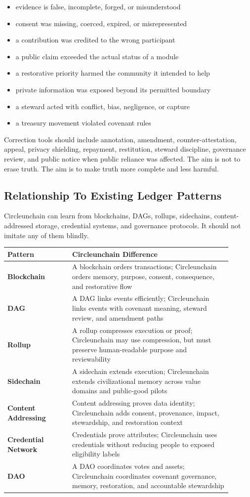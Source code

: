 \documentclass[12pt]{article}
\begin{document}
\begin{itemize}
  \item evidence is false, incomplete, forged, or misunderstood
  \item consent was missing, coerced, expired, or misrepresented
  \item a contribution was credited to the wrong participant
  \item a public claim exceeded the actual status of a module
  \item a restorative priority harmed the community it intended to help
  \item private information was exposed beyond its permitted boundary
  \item a steward acted with conflict, bias, negligence, or capture
  \item a treasury movement violated covenant rules
\end{itemize}

Correction tools should include annotation, amendment, counter-attestation, appeal, privacy shielding, repayment, restitution, steward discipline, governance review, and public notice when public reliance was affected. The aim is not to erase truth. The aim is to make truth more complete and less harmful.

\subsection{Relationship To Existing Ledger Patterns}

Circleunchain can learn from blockchains, DAGs, rollups, sidechains, content-addressed storage, credential systems, and governance protocols. It should not imitate any of them blindly.

\begin{longtable}{>{\bfseries}p{0.26\linewidth}p{0.64\linewidth}}
\toprule
Pattern & Circleunchain Difference \\
\midrule
Blockchain & A blockchain orders transactions; Circleunchain orders memory, purpose, consent, consequence, and restorative flow \\
DAG & A DAG links events efficiently; Circleunchain links events with covenant meaning, steward review, and amendment paths \\
Rollup & A rollup compresses execution or proof; Circleunchain may use compression, but must preserve human-readable purpose and reviewability \\
Sidechain & A sidechain extends execution; Circleunchain extends civilizational memory across value domains and public-good pilots \\
Content Addressing & Content addressing proves data identity; Circleunchain adds consent, provenance, impact, stewardship, and restoration context \\
Credential Network & Credentials prove attributes; Circleunchain uses credentials without reducing people to exposed eligibility labels \\
DAO & A DAO coordinates votes and assets; Circleunchain coordinates covenant governance, memory, restoration, and accountable stewardship \\
\bottomrule
\end{longtable}
\end{document}
